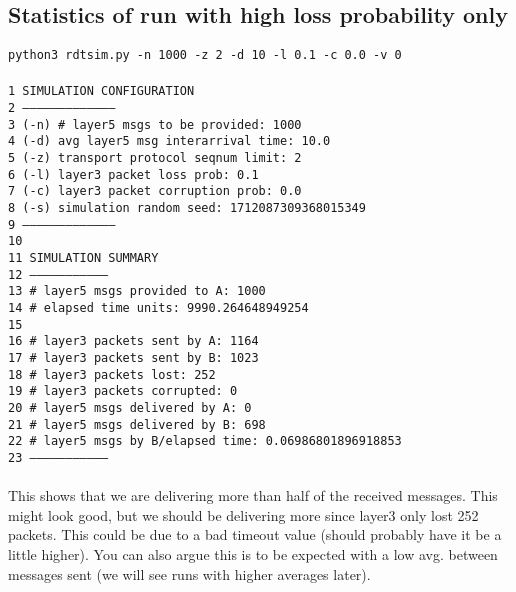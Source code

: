 \documentclass{article}
\begin{document}
\subsection{Statistics of run with high loss probability only}
\hspace*{10mm} \texttt{python3 rdtsim.py -n 1000 -z 2 -d 10 -l 0.1 -c 0.0 -v 0}
\texttt{\\\\1 SIMULATION CONFIGURATION\\
2 --------------------------------------\\
3 (-n) \# layer5 msgs to be provided:      1000\\
4 (-d) avg layer5 msg interarrival time:  10.0\\
5 (-z) transport protocol seqnum limit:   2\\
6 (-l) layer3 packet loss prob:           0.1\\
7 (-c) layer3 packet corruption prob:     0.0\\
8 (-s) simulation random seed:            1712087309368015349\\
9 --------------------------------------\\
10 \\
11 SIMULATION SUMMARY\\
12 --------------------------------\\
13 \# layer5 msgs provided to A:      1000\\
14 \# elapsed time units:             9990.264648949254\\
15 \\
16 \# layer3 packets sent by A:       1164\\
17 \# layer3 packets sent by B:       1023\\
18 \# layer3 packets lost:            252\\
19 \# layer3 packets corrupted:       0\\
20 \# layer5 msgs delivered by A:     0\\
21 \# layer5 msgs delivered by B:     698\\
22 \# layer5 msgs by B/elapsed time:  0.06986801896918853\\
23 --------------------------------\\}
\\ This shows that we are delivering more than half of the received messages.
This might look good, but we should be delivering more since layer3 only lost
252 packets. This could be due to a bad timeout value (should probably have it
be a little higher). You can also argue this is to be expected with a low avg. between messages sent (we will see runs with higher averages later).
\\\\
\end{document}
